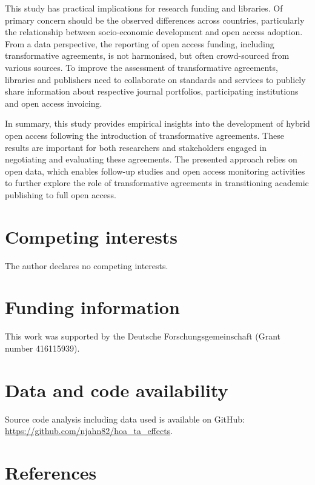 \documentclass[a4paper,man,floatsintext,longtable,noextraspace,12pt]{apa6}
\begin{document}
This study has practical implications for research funding and
libraries. Of primary concern should be the observed differences across
countries, particularly the relationship between socio-economic
development and open access adoption. From a data perspective, the
reporting of open access funding, including transformative agreements,
is not harmonised, but often crowd-sourced from various sources. To
improve the assessment of transformative agreements, libraries and
publishers need to collaborate on standards and services to publicly
share information about respective journal portfolios, participating
institutions and open access invoicing.

In summary, this study provides empirical insights into the development
of hybrid open access following the introduction of transformative
agreements. These results are important for both researchers and
stakeholders engaged in negotiating and evaluating these agreements. The
presented approach relies on open data, which enables follow-up studies
and open access monitoring activities to further explore the role of
transformative agreements in transitioning academic publishing to full
open access.

\hypertarget{competing-interests}{%
\section{Competing interests}\label{competing-interests}}

The author declares no competing interests.

\hypertarget{funding-information}{%
\section{Funding information}\label{funding-information}}

This work was supported by the Deutsche Forschungsgemeinschaft (Grant
number 416115939).

\hypertarget{data-and-code-availability}{%
\section{Data and code availability}\label{data-and-code-availability}}

Source code analysis including data used is available on GitHub:
\url{https://github.com/njahn82/hoa_ta_effects}.

\hypertarget{references}{%
\section*{References}\label{references}}
\end{document}

